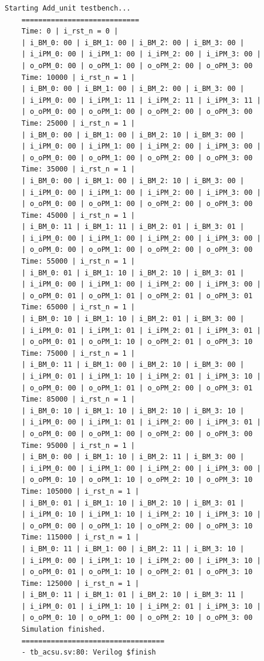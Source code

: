 \begin{lstlisting}[style=StyleResult, language=Result]
	Starting Add_unit testbench...
	============================
	Time: 0 | i_rst_n = 0 | 
	| i_BM_0: 00 | i_BM_1: 00 | i_BM_2: 00 | i_BM_3: 00 |
	| i_iPM_0: 00 | i_iPM_1: 00 | i_iPM_2: 00 | i_iPM_3: 00 |
	| o_oPM_0: 00 | o_oPM_1: 00 | o_oPM_2: 00 | o_oPM_3: 00
	Time: 10000 | i_rst_n = 1 | 
	| i_BM_0: 00 | i_BM_1: 00 | i_BM_2: 00 | i_BM_3: 00 |
	| i_iPM_0: 00 | i_iPM_1: 11 | i_iPM_2: 11 | i_iPM_3: 11 |
	| o_oPM_0: 00 | o_oPM_1: 00 | o_oPM_2: 00 | o_oPM_3: 00
	Time: 25000 | i_rst_n = 1 | 
	| i_BM_0: 00 | i_BM_1: 00 | i_BM_2: 10 | i_BM_3: 00 |
	| i_iPM_0: 00 | i_iPM_1: 00 | i_iPM_2: 00 | i_iPM_3: 00 |
	| o_oPM_0: 00 | o_oPM_1: 00 | o_oPM_2: 00 | o_oPM_3: 00
	Time: 35000 | i_rst_n = 1 | 
	| i_BM_0: 00 | i_BM_1: 00 | i_BM_2: 10 | i_BM_3: 00 |
	| i_iPM_0: 00 | i_iPM_1: 00 | i_iPM_2: 00 | i_iPM_3: 00 |
	| o_oPM_0: 00 | o_oPM_1: 00 | o_oPM_2: 00 | o_oPM_3: 00
	Time: 45000 | i_rst_n = 1 | 
	| i_BM_0: 11 | i_BM_1: 11 | i_BM_2: 01 | i_BM_3: 01 |
	| i_iPM_0: 00 | i_iPM_1: 00 | i_iPM_2: 00 | i_iPM_3: 00 |
	| o_oPM_0: 00 | o_oPM_1: 00 | o_oPM_2: 00 | o_oPM_3: 00
	Time: 55000 | i_rst_n = 1 | 
	| i_BM_0: 01 | i_BM_1: 10 | i_BM_2: 10 | i_BM_3: 01 |
	| i_iPM_0: 00 | i_iPM_1: 00 | i_iPM_2: 00 | i_iPM_3: 00 |
	| o_oPM_0: 01 | o_oPM_1: 01 | o_oPM_2: 01 | o_oPM_3: 01
	Time: 65000 | i_rst_n = 1 | 
	| i_BM_0: 10 | i_BM_1: 10 | i_BM_2: 01 | i_BM_3: 00 |
	| i_iPM_0: 01 | i_iPM_1: 01 | i_iPM_2: 01 | i_iPM_3: 01 |
	| o_oPM_0: 01 | o_oPM_1: 10 | o_oPM_2: 01 | o_oPM_3: 10
	Time: 75000 | i_rst_n = 1 | 
	| i_BM_0: 11 | i_BM_1: 00 | i_BM_2: 10 | i_BM_3: 00 |
	| i_iPM_0: 01 | i_iPM_1: 10 | i_iPM_2: 01 | i_iPM_3: 10 |
	| o_oPM_0: 00 | o_oPM_1: 01 | o_oPM_2: 00 | o_oPM_3: 01
	Time: 85000 | i_rst_n = 1 | 
	| i_BM_0: 10 | i_BM_1: 10 | i_BM_2: 10 | i_BM_3: 10 |
	| i_iPM_0: 00 | i_iPM_1: 01 | i_iPM_2: 00 | i_iPM_3: 01 |
	| o_oPM_0: 00 | o_oPM_1: 00 | o_oPM_2: 00 | o_oPM_3: 00
	Time: 95000 | i_rst_n = 1 | 
	| i_BM_0: 00 | i_BM_1: 10 | i_BM_2: 11 | i_BM_3: 00 |
	| i_iPM_0: 00 | i_iPM_1: 00 | i_iPM_2: 00 | i_iPM_3: 00 |
	| o_oPM_0: 10 | o_oPM_1: 10 | o_oPM_2: 10 | o_oPM_3: 10
	Time: 105000 | i_rst_n = 1 | 
	| i_BM_0: 01 | i_BM_1: 10 | i_BM_2: 10 | i_BM_3: 01 |
	| i_iPM_0: 10 | i_iPM_1: 10 | i_iPM_2: 10 | i_iPM_3: 10 |
	| o_oPM_0: 00 | o_oPM_1: 10 | o_oPM_2: 00 | o_oPM_3: 10
	Time: 115000 | i_rst_n = 1 | 
	| i_BM_0: 11 | i_BM_1: 00 | i_BM_2: 11 | i_BM_3: 10 |
	| i_iPM_0: 00 | i_iPM_1: 10 | i_iPM_2: 00 | i_iPM_3: 10 |
	| o_oPM_0: 01 | o_oPM_1: 10 | o_oPM_2: 01 | o_oPM_3: 10
	Time: 125000 | i_rst_n = 1 | 
	| i_BM_0: 11 | i_BM_1: 01 | i_BM_2: 10 | i_BM_3: 11 |
	| i_iPM_0: 01 | i_iPM_1: 10 | i_iPM_2: 01 | i_iPM_3: 10 |
	| o_oPM_0: 10 | o_oPM_1: 00 | o_oPM_2: 10 | o_oPM_3: 00
	Simulation finished.
	==================================
	- tb_acsu.sv:80: Verilog $finish
\end{lstlisting}


